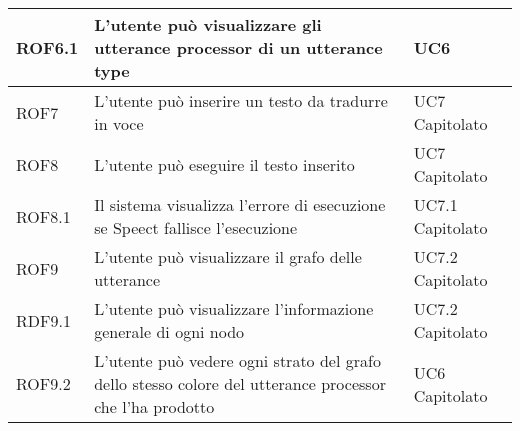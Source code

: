 \documentclass[../AnalisideiRequisiti.tex]{subfiles}
\begin{document}
\begin{longtable}{| p{3cm} | p{6cm} | p{3cm} |}
		\newline ROF6.1&
		\newline L'utente può visualizzare gli utterance processor di un utterance type&
		\newline UC6 
		\\[1em]
		\hline
			
		\newline ROF7&
		\newline L'utente può inserire un testo da tradurre in voce&
		\newline UC7 \newline Capitolato
		\\[1em]
		
		\hline
		\newline ROF8&
		\newline L'utente può eseguire il testo inserito&
		\newline UC7 \newline Capitolato
		\\[1em]
		\hline
		\newline ROF8.1&
		\newline Il sistema visualizza l'errore di esecuzione se Speect fallisce l'esecuzione&
		\newline UC7.1 \newline Capitolato
		\\[1em]
		\hline
		
			\newline ROF9&
		\newline L'utente può visualizzare il grafo delle utterance&
		\newline UC7.2 \newline Capitolato
		\\[1em]
		\hline
		
			
		
			\newline RDF9.1&
		\newline L'utente può visualizzare l'informazione generale di ogni nodo&
		\newline UC7.2 \newline Capitolato
		\\[1em]
		\hline
		
		\newline ROF9.2&
		\newline L'utente può vedere ogni strato del grafo dello stesso colore del utterance processor che l'ha prodotto &
		\newline UC6 \newline Capitolato
		\\[1em]
		\hline
		

\end{longtable}
\end{document}
